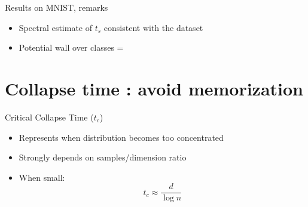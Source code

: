 \documentclass[aspectratio=169]{beamer}
\begin{document}
\begin{frame}{Results on MNIST, remarks}
    \begin{itemize}
        \item Spectral estimate of $t_s$ consistent with the dataset
        \item Potential wall over classes = 
    \end{itemize}

    
    
    \begin{center}
    \end{center}
\end{frame}















\section{Collapse time : avoid memorization}


\begin{frame}{Critical Collapse Time ($t_c$)}
    \begin{itemize}

        \item Represents when distribution becomes too concentrated
        \item Strongly depends on samples/dimension ratio
        \item When small:
        \begin{equation}
            t_c \approx \frac{d}{\log n}
        \end{equation}
    \end{itemize}
    
    \begin{center}
    \end{center}
\end{frame}
\end{document}
